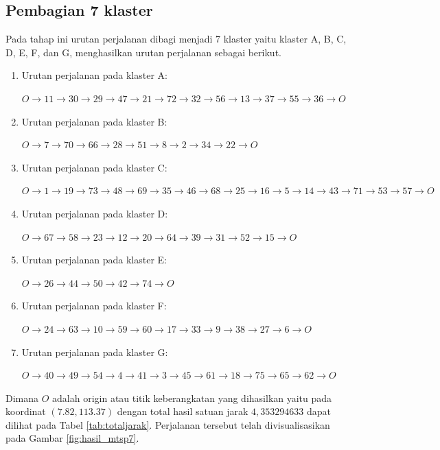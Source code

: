 \subsection{Pembagian 7 klaster}

Pada tahap ini urutan perjalanan dibagi menjadi 7 klaster yaitu klaster A, B, C, D, E, F, dan G, menghasilkan urutan perjalanan sebagai berikut.

\begin{enumerate}

\item Urutan perjalanan pada klaster A:

$O \to 11 \to 30 \to 29 \to 47 \to 21 \to 72 \to 32 \to 56 \to 13 \to 37 \to 55 \to 36 \to O$

\item Urutan perjalanan pada klaster B:

$O \to 7 \to 70 \to 66 \to 28 \to 51 \to 8 \to 2 \to 34 \to 22 \to O$

\item Urutan perjalanan pada klaster C:

$O \to 1 \to 19 \to 73 \to 48 \to 69 \to 35 \to 46 \to 68 \to 25 \to 16 \to 5 \to 14 \to 43 \to 71 \to 53 \to 57 \to O$

\item Urutan perjalanan pada klaster D:

$O \to 67 \to 58 \to 23 \to 12 \to 20 \to 64 \to 39 \to 31 \to 52 \to 15 \to O$

\item Urutan perjalanan pada klaster E:

$O \to 26 \to 44 \to 50 \to 42 \to 74 \to O$

\item Urutan perjalanan pada klaster F:

$O \to 24 \to 63 \to 10 \to 59 \to 60 \to 17 \to 33 \to 9 \to 38 \to 27 \to 6 \to O$

\item Urutan perjalanan pada klaster G:

$O \to 40 \to 49 \to 54 \to 4 \to 41 \to 3 \to 45 \to 61 \to 18 \to 75 \to 65 \to 62 \to O$

\end{enumerate}

Dimana $O$ adalah origin atau titik keberangkatan yang dihasilkan yaitu pada koordinat $(7.82, 113.37)$ dengan total hasil satuan jarak $4,353294633$ dapat dilihat pada Tabel \ref{tab:totaljarak}. Perjalanan tersebut telah divisualisasikan pada Gambar \ref{fig:hasil_mtsp7}.

